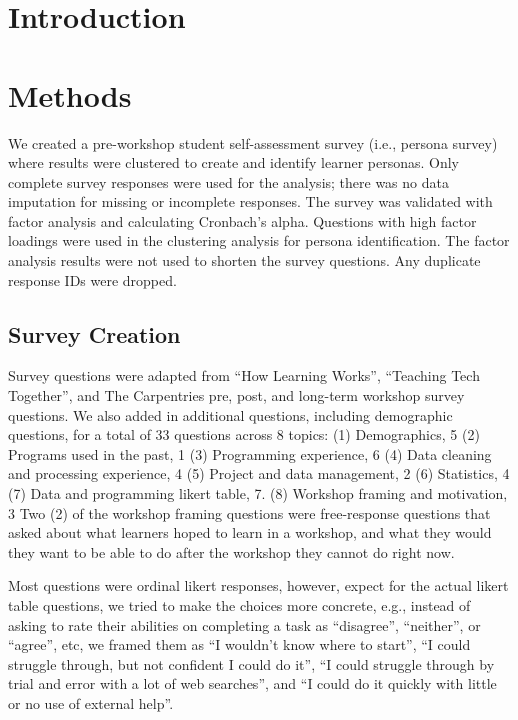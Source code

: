 \documentclass[../main.tex]{subfiles}
\begin{document}
\section{Introduction}

\section{Methods}

    We created a pre-workshop student self-assessment survey (i.e., persona survey)
    where results were clustered to create and identify learner personas.
    Only complete survey responses were used for the analysis;
    there was no data imputation for missing or incomplete responses.
    The survey was validated with factor analysis and calculating Cronbach's alpha.
    Questions with high factor loadings were used in the clustering analysis for persona identification.
    The factor analysis results were not used to shorten the survey questions.
    Any duplicate response IDs were dropped.

    \subsection{Survey Creation}

        Survey questions were adapted from
        ``How Learning Works'',
        ``Teaching Tech Together'', and
        The Carpentries pre, post, and long-term workshop survey questions.
        We also added in additional questions, including demographic questions,
        for a total of 33 questions across 8 topics:
        (1) Demographics, 5
        (2) Programs used in the past, 1
        (3) Programming experience, 6
        (4) Data cleaning and processing experience, 4
        (5) Project and data management, 2
        (6) Statistics, 4
        (7) Data and programming likert table, 7.
        (8) Workshop framing and motivation, 3
        Two (2) of the workshop framing questions were free-response questions that asked about
        what learners hoped to learn in a workshop,
        and what they would they want to be able to do after the workshop they cannot do right now.

        Most questions were ordinal likert responses, however,
        expect for the actual likert table questions,
        we tried to make the choices more concrete,
        e.g., instead of asking to rate their abilities on completing a task as
        ``disagree'', ``neither'', or ``agree'', etc,
        we framed them as ``I wouldn't know where to start'',
        ``I could struggle through, but not confident I could do it'',
        ``I could struggle through by trial and error with a lot of web searches'',
        and
        ``I could do it quickly with little or no use of external help''.
\end{document}
